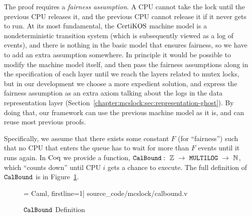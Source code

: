 The proof  requires a \emph{fairness assumption}.
A CPU cannot take the lock until the previous CPU releases it, 
and the previous CPU cannot release it if it never gets to run. 
At its most fundamental, the $\mathrm{CertiKOS}$ machine model is a nondeterministic 
transition system (which is subsequently viewed as a log of events), 
and there is nothing in the basic model that ensures fairness, 
so we have to add an extra assumption somewhere. In principle it would be 
possible to modify the machine model itself, and then pass the fairness assumptions 
along in the specification of each layer until we reach the layers related to mutex locks, 
but in our development we choose a more expedient solution, and express
the fairness assumption as an extra axiom talking about the logs 
in the data representation layer (Section~\ref{chapter:mcslock:sec:representation-ghost}). 
By doing that, our framework can use the previous machine 
model as it is, and can reuse most previous proofs.

Specifically, we assume that there exists some constant $F$ (for ``fairness'') such that no CPU that enters the queue has to wait for more than $F$ events until it runs again. 
In $\mathrm{Coq}$ we provide a function, $\CalBound:\ \ztype\ \rightarrow\ \lockmultilog\ \rightarrow \ \nattype$,
which ``counts down'' 
until CPU $i$ gets a chance to 
execute. 
The full definition of ${\mathrm{\texttt{CalBound}}}$ is in Figure~\ref{fig:chapter:mcslock:calbound-definition}.

\begin{figure}
\begin{center}
 = Caml, firstline=1] {source_code/mcslock/calbound.v}
\end{center}
\caption{${\mathrm{\texttt{CalBound}}}$ Definition}
\label{fig:chapter:mcslock:calbound-definition}
\end{figure}

